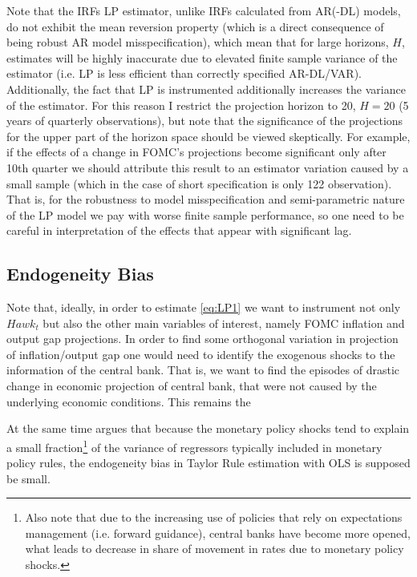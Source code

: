 \documentclass[11pt]{article}
\begin{document}
Note that the IRFs LP estimator, unlike IRFs calculated from AR(-DL) models, do not exhibit the mean reversion property (which is a direct consequence of being robust AR model misspecification), which mean that for large horizons, $H$, estimates will be highly inaccurate due to elevated finite sample variance of the estimator (i.e. LP is less efficient than correctly specified AR-DL/VAR). 
Additionally, the fact that LP is instrumented additionally increases the variance of the estimator.
For this reason I restrict the projection horizon to 20, $H=20$ (5 years of quarterly observations), but note that the significance of the projections for the upper part of the horizon space should be viewed skeptically. 
For example, if the effects of a change in FOMC's projections become significant only after 10th quarter we should attribute this result to an estimator variation caused by a small sample (which in the case of short specification is only 122 observation).
That is, for the robustness to model misspecification and semi-parametric nature of the LP model we pay with worse finite sample performance, so one need to be careful in interpretation of the effects that appear with significant lag. 


\subsection{Endogeneity Bias}

Note that, ideally, in order to estimate \vref{eq:LP1} we want to instrument not only $\mathit{Hawk}_{t}$ but also the other main variables of interest, namely FOMC inflation and output gap projections. 
In order to find some orthogonal variation in projection of inflation/output gap one would need to identify the exogenous shocks to the information of the central bank. 
That is, we want to find the episodes of drastic change in economic projection of central bank, that were not caused by the underlying economic conditions. 
This remains the 


At the same time \citet{Carvalho2021} argues that because the monetary policy shocks tend to explain a small fraction\footnote{Also note that due to the increasing use of policies that rely on expectations management (i.e. forward guidance), central banks have become more opened, what leads to decrease in share of movement in rates due to monetary policy shocks.} of the variance of regressors typically included in monetary policy rules, the endogeneity bias in Taylor Rule estimation with OLS is supposed be small.
\end{document}
